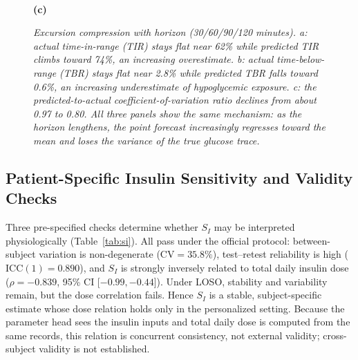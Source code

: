 \documentclass[journal]{IEEEtran}
\begin{document}
\begin{figure}[t]
\begin{minipage}[t]{0.325\textwidth}\centering
{}\\[2pt]
{\normalsize\bfseries (c)}
\end{minipage}
\caption{\small\textit{Excursion compression with horizon (30/60/90/120 minutes). a: actual time-in-range (TIR) stays flat near 62\% while predicted TIR climbs toward 74\%, an increasing overestimate. b: actual time-below-range (TBR) stays flat near 2.8\% while predicted TBR falls toward 0.6\%, an increasing underestimate of hypoglycemic exposure. c: the predicted-to-actual coefficient-of-variation ratio declines from about 0.97 to 0.80. All three panels show the same mechanism: as the horizon lengthens, the point forecast increasingly regresses toward the mean and loses the variance of the true glucose trace.}}
\label{fig:excursion}
\end{figure}




\subsection{Patient-Specific Insulin Sensitivity and Validity Checks}
\label{sec:si_validation}

Three pre-specified checks determine whether $S_I$ may be interpreted physiologically (Table~\ref{tab:si}). All pass under the official protocol: between-subject variation is non-degenerate ($\text{CV} = 35.8\%$), test--retest reliability is high ($\text{ICC}(1) = 0.890$), and $S_I$ is strongly inversely related to total daily insulin dose ($\rho = -0.839$, 95\% CI [$-0.99, -0.44$]). Under LOSO, stability and variability remain, but the dose correlation fails. Hence $S_I$ is a stable, subject-specific estimate whose dose relation holds only in the personalized setting. Because the parameter head sees the insulin inputs and total daily dose is computed from the same records, this relation is concurrent consistency, not external validity; cross-subject validity is not established.
\end{document}
